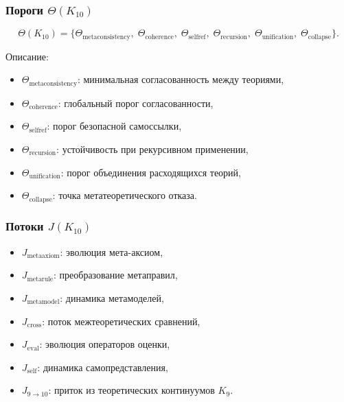 \subsubsection{Пороги $\Theta(K_{10})$}

\[
\Theta(K_{10})=
\{
\Theta_{\mathrm{metaconsistency}},\;
\Theta_{\mathrm{coherence}},\;
\Theta_{\mathrm{selfref}},\;
\Theta_{\mathrm{recursion}},\;
\Theta_{\mathrm{unification}},\;
\Theta_{\mathrm{collapse}}
\}.
\]

Описание:
\begin{itemize}
    \item $\Theta_{\mathrm{metaconsistency}}$: минимальная согласованность между теориями,
    \item $\Theta_{\mathrm{coherence}}$: глобальный порог согласованности,
    \item $\Theta_{\mathrm{selfref}}$: порог безопасной самоссылки,
    \item $\Theta_{\mathrm{recursion}}$: устойчивость при рекурсивном применении,
    \item $\Theta_{\mathrm{unification}}$: порог объединения расходящихся теорий,
    \item $\Theta_{\mathrm{collapse}}$: точка метатеоретического отказа.
\end{itemize}

\subsubsection{Потоки $J(K_{10})$}

\begin{itemize}
    \item $J_{\mathrm{metaaxiom}}$: эволюция мета-аксиом,
    \item $J_{\mathrm{metarule}}$: преобразование метаправил,
    \item $J_{\mathrm{metamodel}}$: динамика метамоделей,
    \item $J_{\mathrm{cross}}$: поток межтеоретических сравнений,
    \item $J_{\mathrm{eval}}$: эволюция операторов оценки,
    \item $J_{\mathrm{self}}$: динамика самопредставления,
    \item $J_{9\to10}$: приток из теоретических континуумов $K_9$.
\end{itemize}

